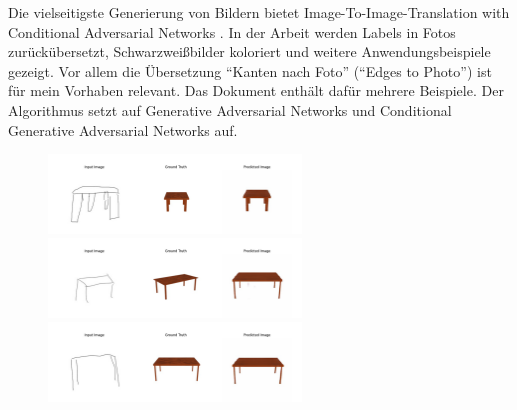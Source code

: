 Die vielseitigste Generierung von Bildern bietet Image-To-Image-Translation with Conditional Adversarial Networks \cite{isola2018imagetoimage}. In der Arbeit werden Labels in Fotos zurückübersetzt, Schwarzweißbilder koloriert und weitere Anwendungsbeispiele gezeigt. Vor allem die Übersetzung ``Kanten nach Foto'' (``Edges to Photo'') ist für mein Vorhaben relevant. Das Dokument enthält dafür mehrere Beispiele. Der Algorithmus setzt auf Generative Adversarial Networks \cite{goodfellow2014generative} und Conditional Generative Adversarial Networks \cite{mirza2014conditional} auf.

\begin{figure}[h]
	\centering
	\includegraphics[width=0.6\textwidth]{bilder/table1small.png}
	\includegraphics[width=0.6\textwidth]{bilder/table2small.png}
	\includegraphics[width=0.6\textwidth]{bilder/table3small.png}


\end{figure}
